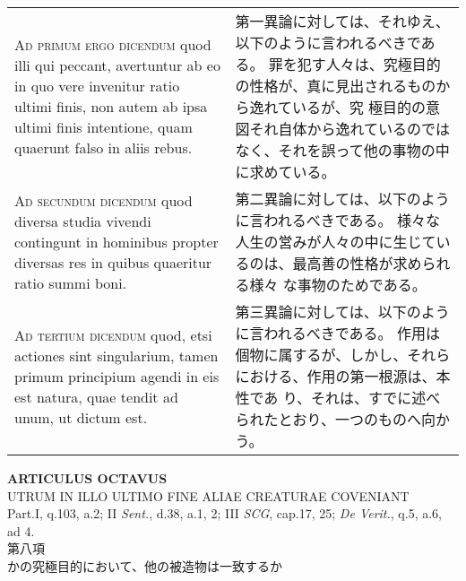 \documentclass[10pt]{jsarticle} %
\begin{document}
\begin{longtable}{p{21em}p{21em}}
\\


{\scshape Ad primum ergo dicendum} quod illi qui
peccant, avertuntur ab eo in quo vere invenitur ratio ultimi finis, non
autem ab ipsa ultimi finis intentione, quam quaerunt falso in aliis
rebus.


&

第一異論に対しては、それゆえ、以下のように言われるべきである。
罪を犯す人々は、究極目的の性格が、真に見出されるものから逸れているが、究
 極目的の意図それ自体から逸れているのではなく、それを誤って他の事物の中
 に求めている。


\\


{\scshape Ad secundum dicendum} quod diversa studia
vivendi contingunt in hominibus propter diversas res in quibus quaeritur
ratio summi boni.


&

第二異論に対しては、以下のように言われるべきである。
様々な人生の営みが人々の中に生じているのは、最高善の性格が求められる様々
 な事物のためである。


\\


{\scshape Ad tertium dicendum} quod, etsi actiones
sint singularium, tamen primum principium agendi in eis est natura, quae
tendit ad unum, ut dictum est.


&


第三異論に対しては、以下のように言われるべきである。
作用は個物に属するが、しかし、それらにおける、作用の第一根源は、本性であ
 り、それは、すでに述べられたとおり、一つのものへ向かう。


\end{longtable}
\newpage





\begin{center}
 {\Large {\bf ARTICULUS OCTAVUS}}\\
 {\large UTRUM IN ILLO ULTIMO FINE ALIAE CREATURAE COVENIANT}\\
 {\footnotesize Part.I, q.103, a.2; II {\itshape Sent.}, d.38, a.1, 2;
 III {\itshape SCG}, cap.17, 25; {\itshape De Verit.}, q.5, a.6, ad 4.}\\
 {\Large 第八項\\かの究極目的において、他の被造物は一致するか}
\end{center}
\end{document}
